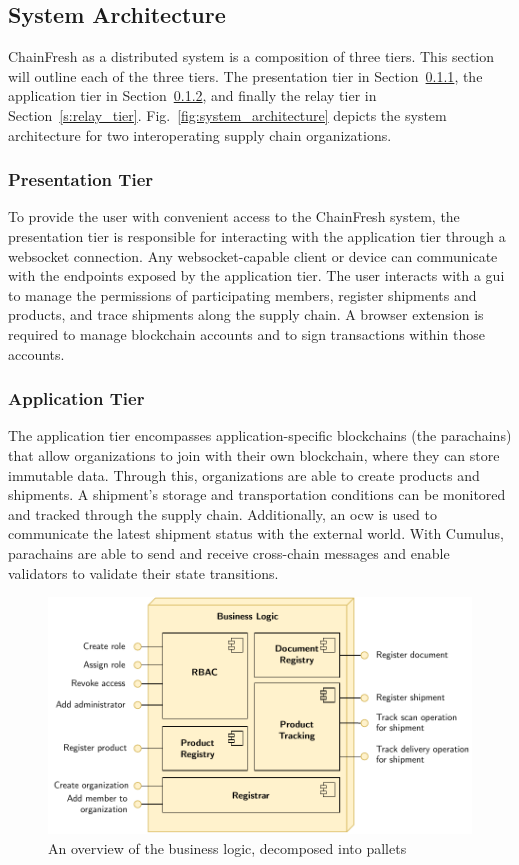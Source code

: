 \documentclass[conference]{IEEEtran}
\begin{document}
\subsection{System Architecture} \label{s:system_architecture}
ChainFresh as a distributed system is a composition of three tiers. 
This section will outline each of the three tiers. The presentation tier in Section~\ref{s:presentation_tier}, the application tier in Section~\ref{s:application_tier}, and finally the relay tier in Section~\ref{s:relay_tier}. Fig.~\ref{fig:system_architecture} depicts the system architecture for two interoperating supply chain organizations. 

\subsubsection{Presentation Tier} \label{s:presentation_tier}
To provide the user with convenient access to the ChainFresh system, the presentation tier is responsible for interacting with the application tier through a websocket connection. 
Any websocket-capable client or device can communicate with the endpoints exposed by the application tier. The user interacts with a \ac{gui} to manage the permissions of participating members, register shipments and products, and trace shipments along the supply chain. A browser extension is required to manage blockchain accounts and to sign transactions within those accounts.

\subsubsection{Application Tier} \label{s:application_tier}
The application tier encompasses application-specific blockchains (the parachains) that allow organizations to join with their own blockchain, where they can store immutable data. Through this, organizations are able to create products and shipments. A shipment's storage and transportation conditions can be monitored and tracked through the supply chain. Additionally, an \ac{ocw} is used to communicate the latest shipment status with the external world. With Cumulus, parachains are able to send and receive cross-chain messages and enable validators to validate their state transitions.

\begin{figure}[h!]
\centerline{\includegraphics[scale=0.6]{business_logic}}
\caption{An overview of the business logic, decomposed into pallets}
\label{fig:business_logic}
\end{figure}
\end{document}
